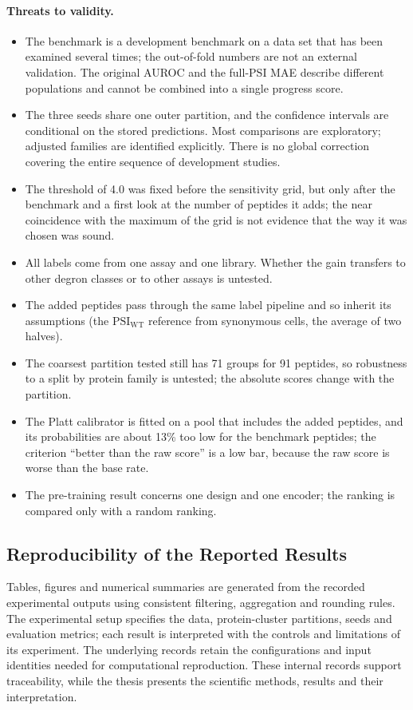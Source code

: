 \paragraph{Threats to validity.}
\begin{itemize}
  \item The benchmark is a development benchmark on a data set that has been examined several times; the
        out-of-fold numbers are not an external validation. The original AUROC and the full-PSI MAE
        describe different populations and cannot be combined into a single progress score.
  \item The three seeds share one outer partition, and the confidence intervals are conditional on the stored
        predictions. Most comparisons are exploratory; adjusted families are identified explicitly.
        There is no global correction covering the entire sequence of development studies.
  \item The threshold of 4.0 was fixed before the sensitivity grid, but only after the benchmark and a first
        look at the number of peptides it adds; the near coincidence with the maximum of the grid is not evidence that the way it was chosen was sound.
  \item All labels come from one assay and one library. Whether the gain transfers to other degron classes or to
        other assays is untested.
  \item The added peptides pass through the same label pipeline and so inherit its assumptions (the $\mathrm{PSI}_{\mathrm{WT}}$
        reference from synonymous cells, the average of two halves).
  \item The coarsest partition tested still has 71 groups for 91 peptides, so robustness to a split by protein family is untested; the
        absolute scores change with the partition.
  \item The Platt calibrator is fitted on a pool that includes the added peptides, and its probabilities are about 13\% too low for the
        benchmark peptides; the criterion ``better than the raw score'' is a low bar, because the raw score is worse than the base rate.
  \item The pre-training result concerns one design and one encoder; the ranking is compared only with a random ranking.
\end{itemize}

\subsection{Reproducibility of the Reported Results}
Tables, figures and numerical summaries are generated from the recorded experimental outputs using
consistent filtering, aggregation and rounding rules. The experimental setup specifies the data,
protein-cluster partitions, seeds and evaluation metrics; each result is interpreted with the controls
and limitations of its experiment. The underlying records retain the configurations and input identities
needed for computational reproduction. These internal records support traceability, while the thesis
presents the scientific methods, results and their interpretation.

